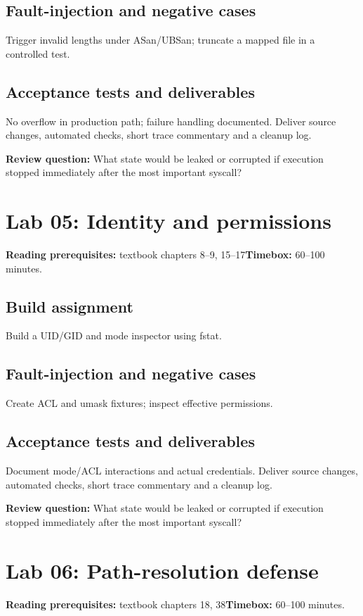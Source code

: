 \documentclass[11pt,letterpaper,oneside]{report}
\begin{document}
\subsection{Fault-injection and negative cases}
Trigger invalid lengths under ASan/UBSan; truncate a mapped file in a controlled test.

\subsection{Acceptance tests and deliverables}
No overflow in production path; failure handling documented. Deliver source changes, automated checks, short trace commentary and a cleanup log.

\textbf{Review question:} What state would be leaked or corrupted if execution stopped immediately after the most important syscall?

\section{Lab 05: Identity and permissions}
\textbf{Reading prerequisites:} textbook chapters 8--9, 15--17\quad \textbf{Timebox:} 60--100 minutes.

\subsection{Build assignment}
Build a UID/GID and mode inspector using fstat.

\subsection{Fault-injection and negative cases}
Create ACL and umask fixtures; inspect effective permissions.

\subsection{Acceptance tests and deliverables}
Document mode/ACL interactions and actual credentials. Deliver source changes, automated checks, short trace commentary and a cleanup log.

\textbf{Review question:} What state would be leaked or corrupted if execution stopped immediately after the most important syscall?

\section{Lab 06: Path-resolution defense}
\textbf{Reading prerequisites:} textbook chapters 18, 38\quad \textbf{Timebox:} 60--100 minutes.
\end{document}

